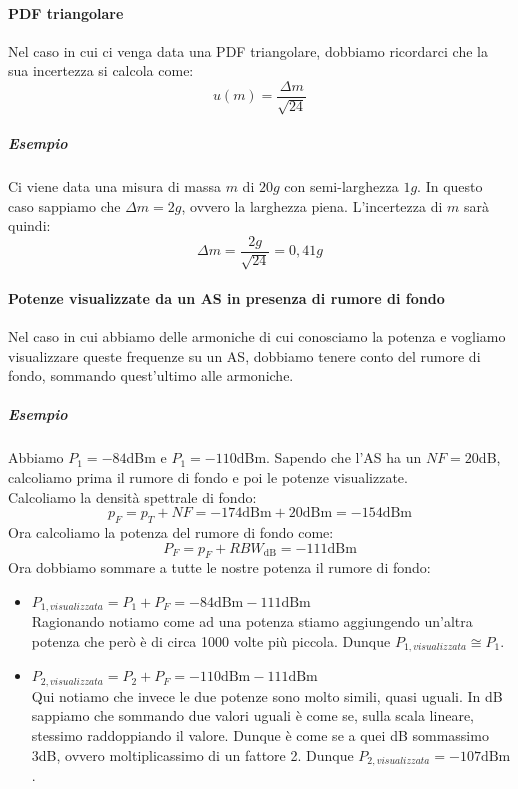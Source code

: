 \documentclass{article}
\begin{document}
	\paragraph*{PDF triangolare}
	Nel caso in cui ci venga data una PDF triangolare, dobbiamo ricordarci che la sua incertezza si calcola come:
	\begin{equation}
		u(m) = \frac{\Delta m}{\sqrt{24}}
	\end{equation}
	\subparagraph*{Esempio}
	Ci viene data una misura di massa $m$ di $20g$ con semi-larghezza $1g$. In questo caso sappiamo che $\Delta m = 2g$, ovvero la larghezza piena. L'incertezza di $m$ sarà quindi:
	\begin{equation}
		\Delta m = \frac{2g}{\sqrt{24}} = 0,41g
	\end{equation} 
	\paragraph*{Potenze visualizzate da un AS in presenza di rumore di fondo}
	Nel caso in cui abbiamo delle armoniche di cui conosciamo la potenza e vogliamo visualizzare queste frequenze su un AS, dobbiamo tenere conto del rumore di fondo, sommando quest'ultimo alle armoniche.
	\subparagraph*{Esempio}
	Abbiamo $P_1 = -84$dBm e $P_1 = -110$dBm. Sapendo che l'AS ha un $NF = 20$dB, calcoliamo prima il rumore di fondo e poi le potenze visualizzate.\\
	Calcoliamo la densità spettrale di fondo:
	\begin{equation}
		p_F = p_T + NF = -174 \text{dBm} + 20 \text{dBm} = -154 \text{dBm}
	\end{equation}
	Ora calcoliamo la potenza del rumore di fondo come:
	\begin{equation}
		P_F = p_F + RBW_{\text{dB}} = -111 \text{dBm}
	\end{equation}
	Ora dobbiamo sommare a tutte le nostre potenza il rumore di fondo:
	\begin{itemize}
		\item $P_{1, visualizzata} = P_1 + P_F = -84 \text{dBm} - 111 \text{dBm}$\\
		Ragionando notiamo come ad una potenza stiamo aggiungendo un'altra potenza che però è di circa 1000 volte più piccola. Dunque $P_{1, visualizzata} \cong P_1$.
		\item $P_{2, visualizzata} = P_2 + P_F = -110 \text{dBm} - 111 \text{dBm}$\\
		Qui notiamo che invece le due potenze sono molto simili, quasi uguali. In dB sappiamo che sommando due valori uguali è come se, sulla scala lineare, stessimo raddoppiando il valore. Dunque è come se a quei dB sommassimo 3dB, ovvero moltiplicassimo di un fattore 2. Dunque $P_{2, visualizzata} = -107 \text{dBm}$.
	\end{itemize}
\end{document}
